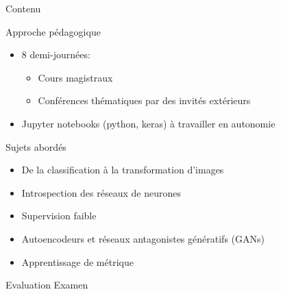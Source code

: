 \documentclass[xcolor=pdftex,dvipsnames,table,mathserif]{beamer}
\begin{document}
\begin{frame}{Contenu}


\begin{block}{Approche pédagogique}

  \begin{itemize}
  \item 8 demi-journées:
    \begin{itemize}
    \item Cours magistraux
    \item Conférences thématiques par des invités extérieurs
    \end{itemize}
  \item Jupyter notebooks (python, keras) à travailler en autonomie
  \end{itemize}
\end{block}

\begin{block}{Sujets abordés}
\begin{itemize}
\item De la classification à la transformation d'images
\item Introspection des réseaux de neurones
\item Supervision faible
\item Autoencodeurs et réseaux antagonistes génératifs (GANs)
\item Apprentissage de métrique
\end{itemize}
\end{block}

  \begin{block}{Evaluation}
  Examen
  \end{block}

\end{frame}


\end{document}
